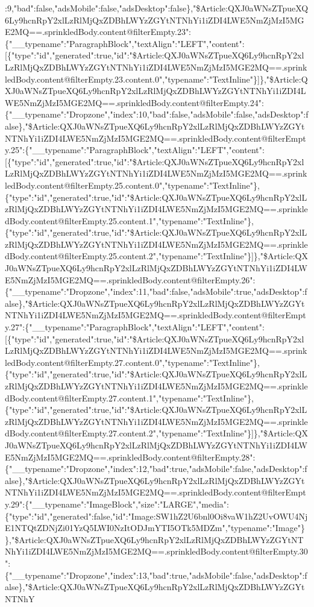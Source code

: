 :9,"bad":false,"adsMobile":false,"adsDesktop":false\},"\$Article:QXJ0aWNsZTpueXQ6Ly9hcnRpY2xlLzRlMjQxZDBhLWYzZGYtNTNhYi1iZDI4LWE5NmZjMzI5MGE2MQ==.sprinkledBody.content@filterEmpty.23":\{"\_\_typename":"ParagraphBlock","textAlign":"LEFT","content":{[}\{"type":"id","generated":true,"id":"\$Article:QXJ0aWNsZTpueXQ6Ly9hcnRpY2xlLzRlMjQxZDBhLWYzZGYtNTNhYi1iZDI4LWE5NmZjMzI5MGE2MQ==.sprinkledBody.content@filterEmpty.23.content.0","typename":"TextInline"\}{]}\},"\$Article:QXJ0aWNsZTpueXQ6Ly9hcnRpY2xlLzRlMjQxZDBhLWYzZGYtNTNhYi1iZDI4LWE5NmZjMzI5MGE2MQ==.sprinkledBody.content@filterEmpty.24":\{"\_\_typename":"Dropzone","index":10,"bad":false,"adsMobile":false,"adsDesktop":false\},"\$Article:QXJ0aWNsZTpueXQ6Ly9hcnRpY2xlLzRlMjQxZDBhLWYzZGYtNTNhYi1iZDI4LWE5NmZjMzI5MGE2MQ==.sprinkledBody.content@filterEmpty.25":\{"\_\_typename":"ParagraphBlock","textAlign":"LEFT","content":{[}\{"type":"id","generated":true,"id":"\$Article:QXJ0aWNsZTpueXQ6Ly9hcnRpY2xlLzRlMjQxZDBhLWYzZGYtNTNhYi1iZDI4LWE5NmZjMzI5MGE2MQ==.sprinkledBody.content@filterEmpty.25.content.0","typename":"TextInline"\},\{"type":"id","generated":true,"id":"\$Article:QXJ0aWNsZTpueXQ6Ly9hcnRpY2xlLzRlMjQxZDBhLWYzZGYtNTNhYi1iZDI4LWE5NmZjMzI5MGE2MQ==.sprinkledBody.content@filterEmpty.25.content.1","typename":"TextInline"\},\{"type":"id","generated":true,"id":"\$Article:QXJ0aWNsZTpueXQ6Ly9hcnRpY2xlLzRlMjQxZDBhLWYzZGYtNTNhYi1iZDI4LWE5NmZjMzI5MGE2MQ==.sprinkledBody.content@filterEmpty.25.content.2","typename":"TextInline"\}{]}\},"\$Article:QXJ0aWNsZTpueXQ6Ly9hcnRpY2xlLzRlMjQxZDBhLWYzZGYtNTNhYi1iZDI4LWE5NmZjMzI5MGE2MQ==.sprinkledBody.content@filterEmpty.26":\{"\_\_typename":"Dropzone","index":11,"bad":false,"adsMobile":true,"adsDesktop":false\},"\$Article:QXJ0aWNsZTpueXQ6Ly9hcnRpY2xlLzRlMjQxZDBhLWYzZGYtNTNhYi1iZDI4LWE5NmZjMzI5MGE2MQ==.sprinkledBody.content@filterEmpty.27":\{"\_\_typename":"ParagraphBlock","textAlign":"LEFT","content":{[}\{"type":"id","generated":true,"id":"\$Article:QXJ0aWNsZTpueXQ6Ly9hcnRpY2xlLzRlMjQxZDBhLWYzZGYtNTNhYi1iZDI4LWE5NmZjMzI5MGE2MQ==.sprinkledBody.content@filterEmpty.27.content.0","typename":"TextInline"\},\{"type":"id","generated":true,"id":"\$Article:QXJ0aWNsZTpueXQ6Ly9hcnRpY2xlLzRlMjQxZDBhLWYzZGYtNTNhYi1iZDI4LWE5NmZjMzI5MGE2MQ==.sprinkledBody.content@filterEmpty.27.content.1","typename":"TextInline"\},\{"type":"id","generated":true,"id":"\$Article:QXJ0aWNsZTpueXQ6Ly9hcnRpY2xlLzRlMjQxZDBhLWYzZGYtNTNhYi1iZDI4LWE5NmZjMzI5MGE2MQ==.sprinkledBody.content@filterEmpty.27.content.2","typename":"TextInline"\}{]}\},"\$Article:QXJ0aWNsZTpueXQ6Ly9hcnRpY2xlLzRlMjQxZDBhLWYzZGYtNTNhYi1iZDI4LWE5NmZjMzI5MGE2MQ==.sprinkledBody.content@filterEmpty.28":\{"\_\_typename":"Dropzone","index":12,"bad":true,"adsMobile":false,"adsDesktop":false\},"\$Article:QXJ0aWNsZTpueXQ6Ly9hcnRpY2xlLzRlMjQxZDBhLWYzZGYtNTNhYi1iZDI4LWE5NmZjMzI5MGE2MQ==.sprinkledBody.content@filterEmpty.29":\{"\_\_typename":"ImageBlock","size":"LARGE","media":\{"type":"id","generated":false,"id":"Image:SW1hZ2U6bnl0Oi8vaW1hZ2UvOWU4NjE1NTQtZDNjZi01YzQ5LWI0NzItODJmYTI5OTk5MDZm","typename":"Image"\}\},"\$Article:QXJ0aWNsZTpueXQ6Ly9hcnRpY2xlLzRlMjQxZDBhLWYzZGYtNTNhYi1iZDI4LWE5NmZjMzI5MGE2MQ==.sprinkledBody.content@filterEmpty.30":\{"\_\_typename":"Dropzone","index":13,"bad":true,"adsMobile":false,"adsDesktop":false\},"\$Article:QXJ0aWNsZTpueXQ6Ly9hcnRpY2xlLzRlMjQxZDBhLWYzZGYtNTNhY